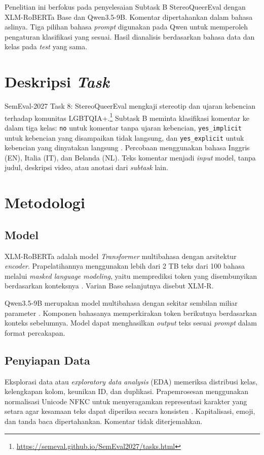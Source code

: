 \documentclass[11pt]{article}
\begin{document}
Penelitian ini berfokus pada penyelesaian Subtask B StereoQueerEval dengan XLM-RoBERTa Base dan Qwen3.5-9B. Komentar dipertahankan dalam bahasa aslinya. Tiga pilihan bahasa \textit{prompt} digunakan pada Qwen untuk memperoleh pengaturan klasifikasi yang sesuai. Hasil dianalisis berdasarkan bahasa data dan kelas pada \textit{test} yang sama.

\section{Deskripsi \textit{Task}}
SemEval-2027 Task 8: StereoQueerEval mengkaji stereotip dan ujaran kebencian terhadap komunitas LGBTQIA+.\footnote{\url{https://semeval.github.io/SemEval2027/tasks.html}} Subtask B meminta klasifikasi komentar ke dalam tiga kelas: \texttt{no} untuk komentar tanpa ujaran kebencian, \nolinkurl{yes_implicit} untuk kebencian yang disampaikan tidak langsung, dan \nolinkurl{yes_explicit} untuk kebencian yang dinyatakan langsung \citep{stereoqueereval-2026-data}. Percobaan menggunakan bahasa Inggris (EN), Italia (IT), dan Belanda (NL). Teks komentar menjadi \textit{input} model, tanpa judul, deskripsi video, atau anotasi dari \textit{subtask} lain.

\section{Metodologi}
\subsection{Model}
XLM-RoBERTa adalah model \textit{Transformer} multibahasa dengan arsitektur \textit{encoder}. Prapelatihannya menggunakan lebih dari 2 TB teks dari 100 bahasa melalui \textit{masked language modeling}, yaitu memprediksi token yang disembunyikan berdasarkan konteksnya \citep{conneau-etal-2020-unsupervised}. Varian Base selanjutnya disebut XLM-R.

Qwen3.5-9B merupakan model multibahasa dengan sekitar sembilan miliar parameter \citep{qwen-team-2026-qwen35}. Komponen bahasanya memperkirakan token berikutnya berdasarkan konteks sebelumnya. Model dapat menghasilkan \textit{output} teks sesuai \textit{prompt} dalam format percakapan.

\subsection{Penyiapan Data}
Eksplorasi data atau \textit{exploratory data analysis} (EDA) memeriksa distribusi kelas, kelengkapan kolom, keunikan ID, dan duplikasi. Prapemrosesan menggunakan normalisasi Unicode NFKC untuk menyeragamkan representasi karakter yang setara agar kesamaan teks dapat diperiksa secara konsisten \citep{unicode-consortium-2026-normalization}. Kapitalisasi, emoji, dan tanda baca dipertahankan. Komentar tidak diterjemahkan.
\end{document}
